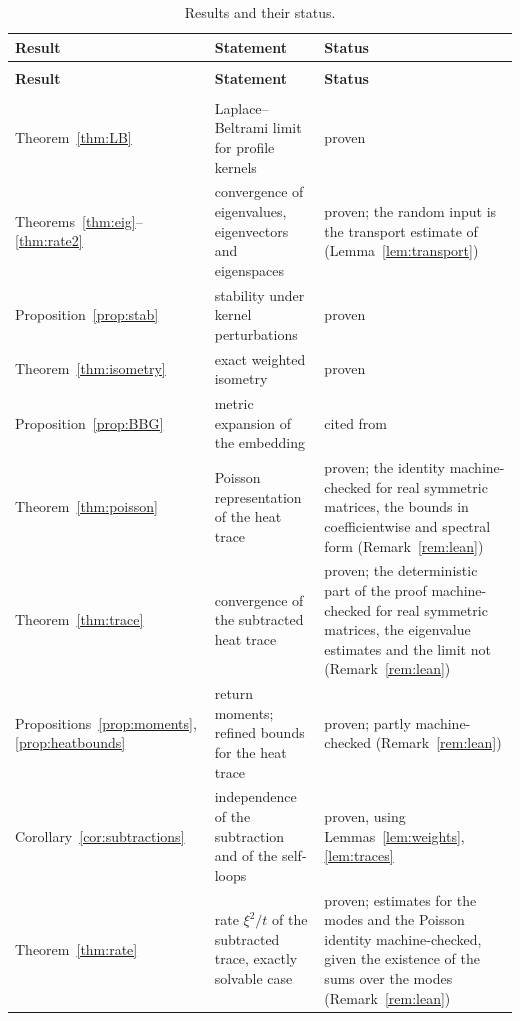 \documentclass[11pt,a4paper]{article}
\theoremstyle{stmt}
\theoremstyle{defn}
\theoremstyle{rmk}
\numberwithin{equation}{section}
\begin{document}
{\small\setlength{\LTpre}{8pt}\setlength{\LTpost}{8pt}
\begin{longtable}{@{}>{\raggedright\arraybackslash}p{}>{\raggedright\arraybackslash}p{}>{\raggedright\arraybackslash}p{}@{}}
\caption{Results and their status.}\label{tab:status}\\
\toprule
\sffamily\bfseries Result & \sffamily\bfseries Statement & \sffamily\bfseries Status\\
\midrule
\endfirsthead
\multicolumn{3}{@{}l}{\sffamily\footnotesize Table~\thetable\ (continued)}\\
\toprule
\sffamily\bfseries Result & \sffamily\bfseries Statement & \sffamily\bfseries Status\\
\midrule
\endhead
\midrule
\multicolumn{3}{r@{}}{\sffamily\footnotesize continued on the next page}\\
\endfoot
\bottomrule
\endlastfoot
Theorem~\ref{thm:LB} & Laplace--Beltrami limit for profile kernels & proven\\
Theorems~\ref{thm:eig}--\ref{thm:rate2} & convergence of eigenvalues, eigenvectors and eigenspaces & proven; the random input is the transport estimate of \cite{GTS,GTGHS} (Lemma~\ref{lem:transport})\\
Proposition~\ref{prop:stab} & stability under kernel perturbations & proven\\
Theorem~\ref{thm:isometry} & exact weighted isometry & proven\\
Proposition~\ref{prop:BBG} & metric expansion of the embedding & cited from \cite{BBG}\\
Theorem~\ref{thm:poisson} & Poisson representation of the heat trace & proven; the identity machine-checked for real symmetric matrices, the bounds in coefficientwise and spectral form (Remark~\ref{rem:lean})\\
Theorem~\ref{thm:trace} & convergence of the subtracted heat trace & proven; the deterministic part of the proof machine-checked for real symmetric matrices, the eigenvalue estimates and the limit not (Remark~\ref{rem:lean})\\
Propositions~\ref{prop:moments}, \ref{prop:heatbounds} & return moments; refined bounds for the heat trace & proven; partly machine-checked (Remark~\ref{rem:lean})\\
Corollary~\ref{cor:subtractions} & independence of the subtraction and of the self-loops & proven, using Lemmas~\ref{lem:weights}, \ref{lem:traces}\\
Theorem~\ref{thm:rate} & rate $\xi^2/t$ of the subtracted trace, exactly solvable case & proven; estimates for the modes and the Poisson identity machine-checked, given the existence of the sums over the modes (Remark~\ref{rem:lean})\\

\end{longtable}}
\end{document}

